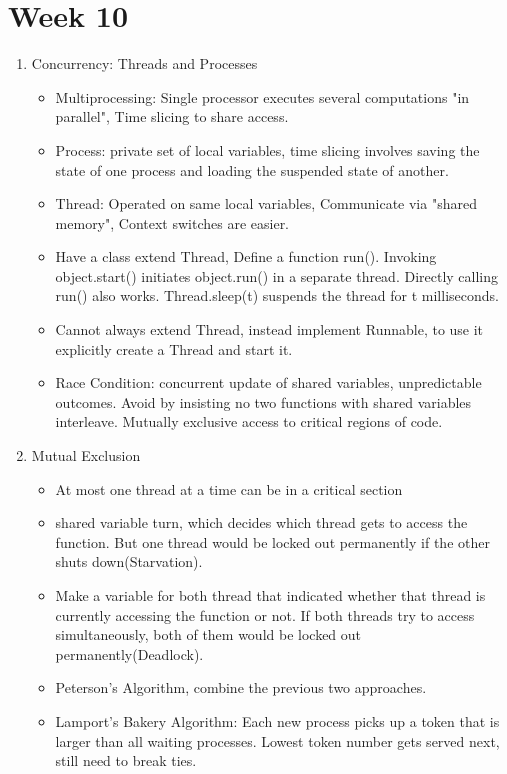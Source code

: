 \documentclass[a4paper]{article}
\begin{document}
\section{Week 10}
\begin{enumerate}
    \item Concurrency: Threads and Processes
    \begin{itemize}
        \item Multiprocessing: Single processor executes several computations "in parallel", Time slicing to share access.
        \item Process: private set of local variables, time slicing involves saving the state of one process and loading the suspended state of another.
        \item Thread: Operated on same local variables, Communicate via "shared memory", Context switches are easier.
        \item Have a class extend Thread, Define a function run(). Invoking object.start() initiates object.run() in a separate thread. Directly calling run() also works. Thread.sleep(t) suspends the thread for t milliseconds.
        \item Cannot always extend Thread, instead implement Runnable, to use it explicitly create a Thread and start it.
        \item Race Condition: concurrent update of shared variables, unpredictable outcomes. Avoid by insisting no two functions with shared variables interleave. Mutually exclusive access to critical regions of code.
    \end{itemize}
    \item Mutual Exclusion
    \begin{itemize}
        \item At most one thread at a time can be in a critical section
        \item shared variable turn, which decides which thread gets to access the function. But one thread would be locked out permanently if the other shuts down(Starvation).
        \item Make a variable for both thread that indicated whether that thread is currently accessing the function or not. If both threads try to access simultaneously, both of them would be locked out permanently(Deadlock).
        \item Peterson's Algorithm, combine the previous two approaches.
        \item Lamport's Bakery Algorithm: Each new process picks up a token that is larger than all waiting processes. Lowest token number gets served next, still need to break ties.

\end{itemize}
\end{enumerate}
\end{document}

